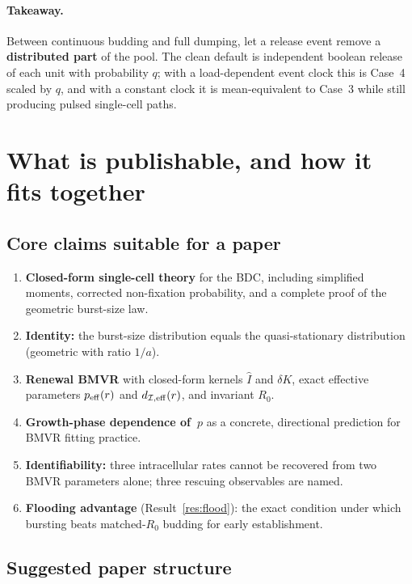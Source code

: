 \documentclass[11pt,a4paper]{article}
\newcommand{\Ihat}{\widehat{I}}
\newcommand{\Icell}{\mathcal{I}}
\theoremstyle{plain}
\theoremstyle{definition}
\theoremstyle{remark}
\begin{document}
\paragraph{Takeaway.}
Between continuous budding and full dumping, let a release event remove a
\textbf{distributed part} of the pool. The clean default is independent
boolean release of each unit with probability $q$; with a load-dependent event
clock this is Case~4 scaled by $q$, and with a constant clock it is mean-equivalent
to Case~3 while still producing pulsed single-cell paths.

\section{What is publishable, and how it fits together}

\subsection{Core claims suitable for a paper}

\begin{enumerate}
\item \textbf{Closed-form single-cell theory} for the BDC, including simplified
moments, corrected non-fixation probability, and a complete proof of the
geometric burst-size law.
\item \textbf{Identity:} the burst-size distribution equals the quasi-stationary
distribution (geometric with ratio $1/a$).
\item \textbf{Renewal BMVR} with closed-form kernels $\Ihat$ and $\delta K$,
exact effective parameters $p_{\rm eff}(r)$ and $d_{\Icell,{\rm eff}}(r)$, and
invariant $R_0$.
\item \textbf{Growth-phase dependence of~$p$} as a concrete, directional
prediction for BMVR fitting practice.
\item \textbf{Identifiability:} three intracellular rates cannot be recovered
from two BMVR parameters alone; three rescuing observables are named.
\item \textbf{Flooding advantage} (Result~\ref{res:flood}): the exact condition
under which bursting beats matched-$R_0$ budding for early establishment.
\end{enumerate}

\subsection{Suggested paper structure}
\end{document}
